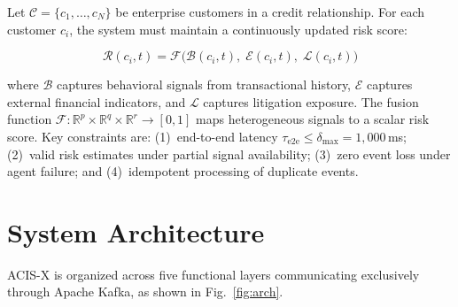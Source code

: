 \documentclass[runningheads]{llncs}
\begin{document}
Let $\mathcal{C} = \{c_1,\ldots,c_N\}$ be enterprise customers in a credit relationship. For each customer $c_i$, the system must maintain a continuously updated risk score:

\begin{equation}
\mathcal{R}(c_i,t) = \mathcal{F}\bigl(\mathcal{B}(c_i,t),\;\mathcal{E}(c_i,t),\;\mathcal{L}(c_i,t)\bigr)
\label{eq:risk}
\end{equation}

where $\mathcal{B}$ captures behavioral signals from transactional history, $\mathcal{E}$ captures external financial indicators, and $\mathcal{L}$ captures litigation exposure. The fusion function $\mathcal{F}: \mathbb{R}^p\times\mathbb{R}^q\times\mathbb{R}^r \to [0,1]$ maps heterogeneous signals to a scalar risk score. Key constraints are: (1)~end-to-end latency $\tau_{\text{e2e}}\leq\delta_{\max}=1{,}000$\,ms; (2)~valid risk estimates under partial signal availability; (3)~zero event loss under agent failure; and (4)~idempotent processing of duplicate events.

\section{System Architecture}
\label{sec:architecture}

ACIS-X is organized across five functional layers communicating exclusively through Apache Kafka, as shown in Fig.~\ref{fig:arch}.
\end{document}
